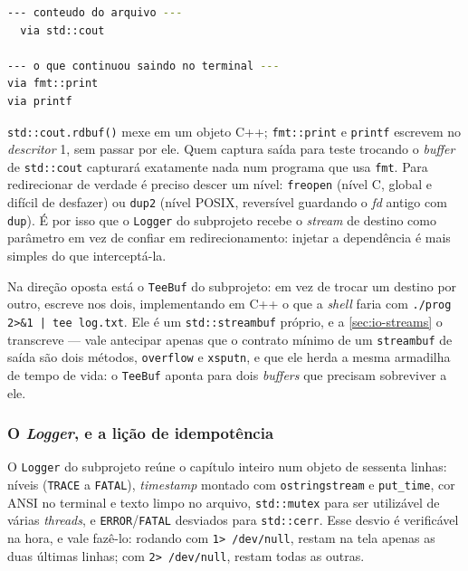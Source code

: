 \begin{lstlisting}[style=bt, language=bash,
    caption={Resultado medido: só uma das três foi capturada.}]
--- conteudo do arquivo ---
  via std::cout

--- o que continuou saindo no terminal ---
via fmt::print
via printf
\end{lstlisting}

\begin{armadilha}
\texttt{std::cout.rdbuf()} mexe em um objeto C++; \texttt{fmt::print} e
\texttt{printf} escrevem no \emph{descritor} 1, sem passar por ele. Quem captura
saída para teste trocando o \emph{buffer} de \texttt{std::cout} capturará
exatamente nada num programa que usa \texttt{fmt}. Para redirecionar de verdade
é preciso descer um nível: \texttt{freopen} (nível C, global e difícil de
desfazer) ou \texttt{dup2} (nível POSIX, reversível guardando o \emph{fd}
antigo com \texttt{dup}). É por isso que o \texttt{Logger} do subprojeto recebe
o \emph{stream} de destino como parâmetro em vez de confiar em
redirecionamento: injetar a dependência é mais simples do que interceptá-la.
\end{armadilha}

Na direção oposta está o \texttt{TeeBuf} do subprojeto: em vez de trocar um
destino por outro, escreve nos dois, implementando em C++ o que a \emph{shell}
faria com \texttt{./prog 2>\&1 | tee log.txt}. Ele é um \texttt{std::streambuf}
próprio, e a \cref{sec:io-streams} o transcreve --- vale antecipar apenas que o
contrato mínimo de um \texttt{streambuf} de saída são dois métodos,
\texttt{overflow} e \texttt{xsputn}, e que ele herda a mesma armadilha de tempo
de vida: o \texttt{TeeBuf} aponta para dois \emph{buffers} que precisam
sobreviver a ele.

\subsubsection{O \emph{Logger}, e a lição de idempotência}
\label{sec:log-idempotente}

O \texttt{Logger} do subprojeto reúne o capítulo inteiro num objeto de sessenta
linhas: níveis (\texttt{TRACE} a \texttt{FATAL}), \emph{timestamp} montado com
\texttt{ostringstream} e \texttt{put\_time}, cor ANSI no terminal e texto limpo
no arquivo, \texttt{std::mutex} para ser utilizável de várias \emph{threads}, e
\texttt{ERROR}/\texttt{FATAL} desviados para \texttt{std::cerr}. Esse desvio é
verificável na hora, e vale fazê-lo: rodando com \texttt{1> /dev/null}, restam
na tela apenas as duas últimas linhas; com \texttt{2> /dev/null}, restam todas
as outras.

